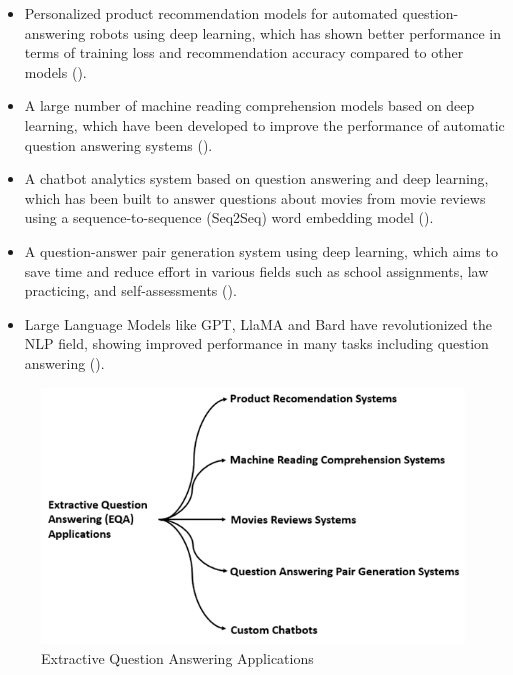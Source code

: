 \begin{itemize}
    \item Personalized product recommendation models for automated question-answering robots using deep learning, which has shown better performance in terms of training loss and recommendation accuracy compared to other models (\cite{Peng2022}).

    \item A large number of machine reading comprehension models based on deep learning, which have been developed to improve the performance of automatic question answering systems (\cite{9072442}).
\newpage
    \item A chatbot analytics system based on question answering and deep learning, which has been built to answer questions about movies from movie reviews using a sequence-to-sequence (Seq2Seq) word embedding model (\cite{shah2020chatbot}).

    \item A question-answer pair generation system using deep learning, which aims to save time and reduce effort in various fields such as school assignments, law practicing, and self-assessments (\cite{9544654}).

    \item Large Language Models like GPT, LlaMA and Bard have revolutionized the NLP field, showing improved performance in many tasks including question answering (\cite{hadi2023large}). 
 
\end{itemize}



\begin{figure}[h!]
    \centering%
    \includegraphics[width=\linewidth]{Figures/Preliminares/applications.png}
    \caption{Extractive Question Answering Applications}
    \label{fig:summary_apps}
\end{figure}


